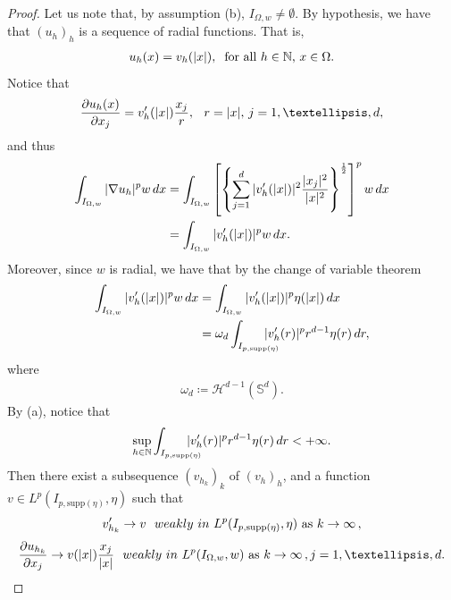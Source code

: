 \documentclass[10pt,a4paper]{amsart}
\def\de{{\rm d}}
\newcommand{\supp}{\mathrm{supp}}
\begin{document}
\begin{proof}
 Let us note that, by assumption (b), $I_{\Omega,w}\neq\emptyset$. By hypothesis, we have that $(u_{h})_{h}$ is a sequence of radial functions. That is,
\begin{align*}
 u_{h}(x)=v_{h}(\vert x\vert), \hskip 0,2cm \text{for all $h\in\mathbb{N}$, $x\in \Omega$.}
 \end{align*}
 Notice that 
\begin{align*}
\frac{\partial u_{h}(x)}{\partial x_{j}}=v_{h}'(\vert x\vert)\frac{x_{j}}{r}, \hskip 0,2cm\, r=\vert x \vert,\, j=1,\ldots,d,
\end{align*}
 and thus 
\begin{align*}
\int_{I_{\Omega,w}}|\nabla u_h|^{p}w\,\de x&=\int_{I_{\Omega,w}}\left[\left\{\sum_{j=1}^{d}|v_{h}'(\vert x\vert)|^{2}\frac{\vert x_{j}\vert^{2}}{\vert x\vert^{2}}\right\}^{\frac{1}{2}}\right]^{p}w\,\de x\\
&=\int_{I_{\Omega,w}}|v_{h}'(\vert x\vert)|^{p}w\,\de x.
\end{align*}
Moreover, since $w$ is radial, we have that by the change of variable theorem
\begin{align*}
\displaystyle\int_{I_{\Omega,w}}|v_{h}'(\vert x\vert)|^{p}w\,\de x&=\displaystyle\int_{I_{\Omega,w}}|v_{h}'(\vert x\vert)|^{p}\eta(\vert x\vert)\,\de x\\
&=\omega_{d}\displaystyle\int_{I_{p,\supp(\eta)}}\hskip -0,5cm|v_{h}'(r)|^{p}r^{d-1}\eta(r)\,\de r,
\end{align*}
where 
\begin{align}
\label{misurasfera}
\omega_{d}\coloneqq \mathcal{H}^{d-1}(\mathbb{S}^{d}).
\end{align}
By (a), notice that 
\begin{align*}
\sup_{h\in \mathbb{N}}\displaystyle\int_{I_{p,\supp(\eta)}}\hskip -0,5cm|v_{h}'(r)|^{p}r^{d-1}\eta(r)\,\de r<+\infty.
\end{align*}
Then there exist a subsequence $(v_{h_k})_k$ of $(v_h)_h$, 
and  a function $v\in L^{p}(I_{p,\supp(\eta)},\eta)$ such that 
\begin{equation}\label{(2)}
v_{h_k}'\to v {\ \ \rm weakly \ in \ }L^{p}(I_{p,\supp(\eta)},\eta)\text{ as }k\to\infty\,,
\end{equation} 
\begin{equation*}
\frac{\partial u_{h_{k}}}{\partial x_{j}}\to v(\vert x\vert)\frac{x_{j}}{\vert x\vert}{\ \ \rm weakly \ in \ }L^{p}(I_{\Omega,w},w)\text{ as }k\to\infty\,, j=1,\ldots,d.
\end{equation*} 

\end{proof}
\end{document}

